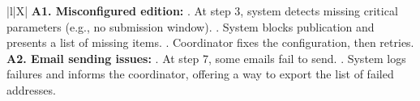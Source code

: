 \begin{xltabular}{\textwidth}{|l|X|}
        \textbf{A1. Misconfigured edition:} . At step 3, system detects missing critical parameters (e.g., no submission window). . System blocks publication and presents a list of missing items. . Coordinator fixes the configuration, then retries. \newline
        \textbf{A2. Email sending issues:} . At step 7, some emails fail to send. . System logs failures and informs the coordinator, offering a way to export the list of failed addresses. \\ \hline
\end{xltabular}

